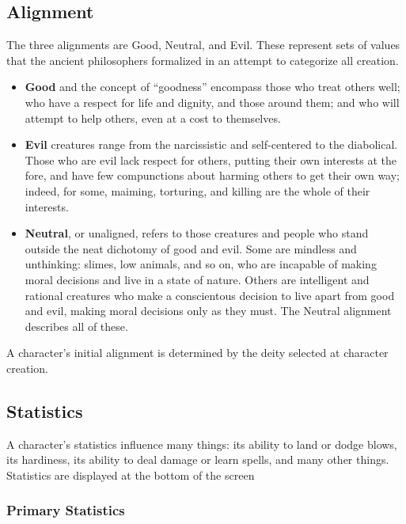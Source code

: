 \subsection{Alignment}

The three alignments are Good, Neutral, and Evil.  These represent sets
of values that the ancient philosophers formalized in an attempt to
categorize all creation.

\begin{itemize}
\item {\bf Good} and the concept of ``goodness'' encompass those who 
treat others well; who have a respect for life and dignity, and those
around them; and who will attempt to help others, even at a cost to
themselves.

\item {\bf Evil} creatures range from the narcissistic and self-centered 
to the diabolical.  Those who are evil lack respect for others, putting 
their own interests at the fore, and have few compunctions about harming 
others to get their own way; indeed, for some, maiming, torturing, and 
killing are the whole of their interests.

\item {\bf Neutral}, or unaligned, refers to those creatures and people
who stand outside the neat dichotomy of good and evil.  Some are mindless
and unthinking: slimes, low animals, and so on, who are incapable of making
moral decisions and live in a state of nature.  Others are intelligent
and rational creatures who make a conscientous decision to live apart from
good and evil, making moral decisions only as they must.  The Neutral
alignment describes all of these.

\end{itemize}

A character's initial alignment is determined by the deity selected at
character creation.

\subsection{Statistics}

A character's statistics influence many things: its ability to land or
dodge blows, its hardiness, its ability to deal damage or learn spells,
and many other things.  Statistics are displayed at the bottom of the
screen

\subsubsection{Primary Statistics}


